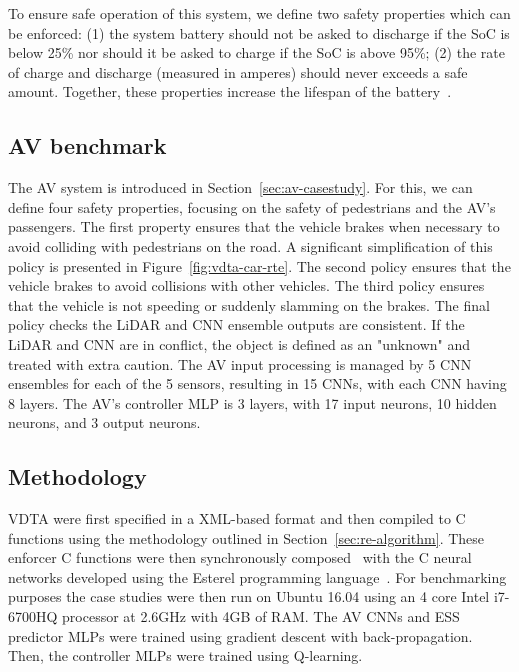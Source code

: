 To ensure safe operation of this system, we define two safety properties which can be enforced:
(1) the system battery should not be asked to discharge if the \ac{SoC} is below 25\% nor should it be asked to charge if the \ac{SoC} is above 95\%;
(2) the rate of charge and discharge (measured in amperes) should never exceeds a safe amount.
Together, these properties increase the lifespan of the battery~\cite{guo2016mechanism}. 

\subsection{\acf{AV} benchmark}

The \ac{AV} system is introduced in Section~\ref{sec:av-casestudy}.
For this, we can define four safety properties, focusing on the safety of pedestrians and the \ac{AV}'s passengers.
The first property ensures that the vehicle brakes when necessary to avoid colliding with pedestrians on the road.
A significant simplification of this policy is presented in Figure~\ref{fig:vdta-car-rte}.
The second policy ensures that the vehicle brakes to avoid collisions with other vehicles.
The third policy ensures that the vehicle is not speeding or suddenly slamming on the brakes.
The final policy checks the LiDAR and \ac{CNN} ensemble outputs are
consistent. If the LiDAR and \ac{CNN} are in conflict, 
the object is defined as an "unknown" and treated with extra caution.
The \ac{AV} input processing is managed by 5 \ac{CNN} ensembles for each of the 5 sensors, resulting in 15 \acp{CNN}, with each \ac{CNN} having 8 layers. 
The \ac{AV}'s controller  MLP is 3 layers, with 17 input neurons, 10 hidden neurons, and 3 output neurons.

\subsection{Methodology}
\ac{VDTA} were first specified in a XML-based format and then compiled to C functions using the methodology outlined in Section~\ref{sec:re-algorithm}.
These enforcer C functions were then synchronously composed~\cite{benveniste2003synchronous} with the C neural networks developed using the Esterel programming language~\cite{Berry00}.
For benchmarking purposes the case studies were then run on Ubuntu 16.04 using an 4 core Intel i7-6700HQ processor at 2.6GHz with 4GB of RAM.
The \ac{AV} \acp{CNN} and \ac{ESS} predictor \acp{MLP} were trained using gradient descent with back-propagation.
Then, the controller \acp{MLP} were trained using Q-learning.

